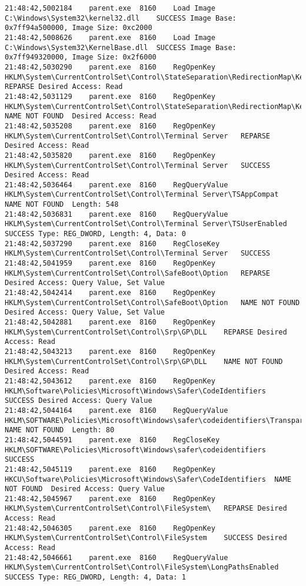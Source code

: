 \begin{verbatim}
21:48:42,5002184	parent.exe	8160	Load Image	C:\Windows\System32\kernel32.dll	SUCCESS	Image Base: 0x7ff94a500000, Image Size: 0xc2000
21:48:42,5008626	parent.exe	8160	Load Image	C:\Windows\System32\KernelBase.dll	SUCCESS	Image Base: 0x7ff949320000, Image Size: 0x2f6000
21:48:42,5030290	parent.exe	8160	RegOpenKey	HKLM\System\CurrentControlSet\Control\StateSeparation\RedirectionMap\Keys	REPARSE	Desired Access: Read
21:48:42,5031129	parent.exe	8160	RegOpenKey	HKLM\System\CurrentControlSet\Control\StateSeparation\RedirectionMap\Keys	NAME NOT FOUND	Desired Access: Read
21:48:42,5035208	parent.exe	8160	RegOpenKey	HKLM\System\CurrentControlSet\Control\Terminal Server	REPARSE	Desired Access: Read
21:48:42,5035820	parent.exe	8160	RegOpenKey	HKLM\System\CurrentControlSet\Control\Terminal Server	SUCCESS	Desired Access: Read
21:48:42,5036464	parent.exe	8160	RegQueryValue	HKLM\System\CurrentControlSet\Control\Terminal Server\TSAppCompat	NAME NOT FOUND	Length: 548
21:48:42,5036831	parent.exe	8160	RegQueryValue	HKLM\System\CurrentControlSet\Control\Terminal Server\TSUserEnabled	SUCCESS	Type: REG_DWORD, Length: 4, Data: 0
21:48:42,5037290	parent.exe	8160	RegCloseKey	HKLM\System\CurrentControlSet\Control\Terminal Server	SUCCESS	
21:48:42,5041959	parent.exe	8160	RegOpenKey	HKLM\System\CurrentControlSet\Control\SafeBoot\Option	REPARSE	Desired Access: Query Value, Set Value
21:48:42,5042414	parent.exe	8160	RegOpenKey	HKLM\System\CurrentControlSet\Control\SafeBoot\Option	NAME NOT FOUND	Desired Access: Query Value, Set Value
21:48:42,5042881	parent.exe	8160	RegOpenKey	HKLM\System\CurrentControlSet\Control\Srp\GP\DLL	REPARSE	Desired Access: Read
21:48:42,5043213	parent.exe	8160	RegOpenKey	HKLM\System\CurrentControlSet\Control\Srp\GP\DLL	NAME NOT FOUND	Desired Access: Read
21:48:42,5043612	parent.exe	8160	RegOpenKey	HKLM\Software\Policies\Microsoft\Windows\Safer\CodeIdentifiers	SUCCESS	Desired Access: Query Value
21:48:42,5044164	parent.exe	8160	RegQueryValue	HKLM\SOFTWARE\Policies\Microsoft\Windows\safer\codeidentifiers\TransparentEnabled	NAME NOT FOUND	Length: 80
21:48:42,5044591	parent.exe	8160	RegCloseKey	HKLM\SOFTWARE\Policies\Microsoft\Windows\safer\codeidentifiers	SUCCESS	
21:48:42,5045119	parent.exe	8160	RegOpenKey	HKCU\Software\Policies\Microsoft\Windows\Safer\CodeIdentifiers	NAME NOT FOUND	Desired Access: Query Value
21:48:42,5045967	parent.exe	8160	RegOpenKey	HKLM\System\CurrentControlSet\Control\FileSystem\	REPARSE	Desired Access: Read
21:48:42,5046305	parent.exe	8160	RegOpenKey	HKLM\System\CurrentControlSet\Control\FileSystem	SUCCESS	Desired Access: Read
21:48:42,5046661	parent.exe	8160	RegQueryValue	HKLM\System\CurrentControlSet\Control\FileSystem\LongPathsEnabled	SUCCESS	Type: REG_DWORD, Length: 4, Data: 1

\end{verbatim}
